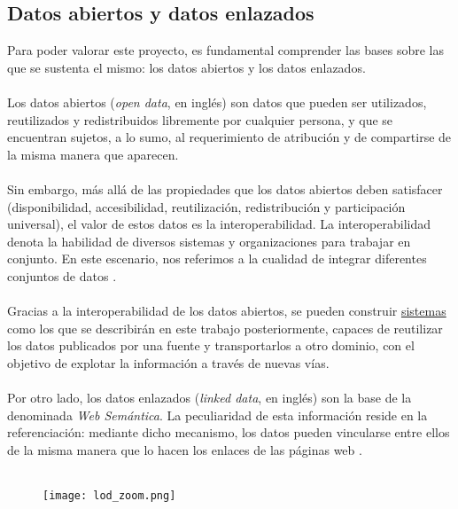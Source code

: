 
    \subsection{Datos abiertos y datos enlazados}
        Para poder valorar este proyecto, es fundamental comprender las bases sobre las que se sustenta el mismo: los datos abiertos y los datos enlazados.
        \\  \\
        Los datos abiertos (\textit{open data}, en inglés) son datos que pueden ser utilizados, reutilizados y redistribuidos libremente por cualquier persona, y que se encuentran sujetos, a lo sumo, al requerimiento de atribución y de compartirse de la misma manera que aparecen.
        \\ \\
        Sin embargo, más allá de las propiedades que los datos abiertos deben satisfacer (disponibilidad, accesibilidad, reutilización, redistribución y participación universal), el valor de estos datos es la interoperabilidad. La interoperabilidad denota la habilidad de diversos sistemas y organizaciones para trabajar en conjunto. En este escenario, nos referimos a la cualidad de integrar diferentes conjuntos de datos \cite{OPENDATA}.
        \\ \\
        Gracias a la interoperabilidad de los datos abiertos, se pueden construir \hyperref[sec:software]{sistemas} como los que se describirán en este trabajo posteriormente, capaces de reutilizar los datos publicados por una fuente y transportarlos a otro dominio, con el objetivo de explotar la información a través de nuevas vías.
        \\ \\
        Por otro lado, los datos enlazados (\textit{linked data}, en inglés) son la base de la denominada \textit{Web Semántica}. La peculiaridad de esta información reside en la referenciación: mediante dicho mecanismo, los datos pueden vincularse entre ellos de la misma manera que lo hacen los enlaces de las páginas web \cite{LINKEDDATA}.
        \\ \\
        
        \begin{figure}[h]
            \centering
            \texttt{[image: lod\_zoom.png]}
            \label{fig:lod}
        \end{figure}
        
